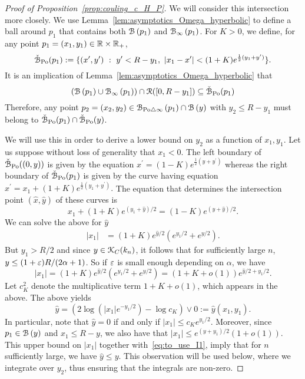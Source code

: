 \begin{proof}[Proof of Proposition~\ref{prop:couling_c_H_P}]
We will consider this intersection more closely. We use Lemma~\ref{lem:asymptotics_Omega_hyperbolic} to define a ball around $p_1$ that contains both 
${\mathcal B}\left(p_1\right)$ and ${\mathcal B}_{\infty}\left(p_1\right)$.
For $K > 0$, we define, for any point $p_1=(x_1,y_1) \in {\ensuremath{\mathbb R}} \times {\ensuremath{\mathbb R}}_+$,
\begin{equation}\label{eq:def_fatball}
	\check{{\mathcal B}}_{{\mathrm{Po}}}(p_1) : = \{ (x',y') \ : \  y' < R - y_1, \ | x_1 - x'| < (1+K) e^{\frac{1}{2} (y_1 + y')}  \}.
\end{equation}
It is an implication of Lemma~\ref{lem:asymptotics_Omega_hyperbolic}  that 
\begin{equation*} %
(\BallHyp{p_1} \cup \BallPo{p_1}) \cap \Rcal([0, R - y_1]) \subseteq \FatBallHyp{p_1}
\end{equation*}
Therefore, any point $p_2 = (x_2,y_2) \in {\mathcal B}_{{\mathrm{Po}} \bigtriangleup \infty}\left(p_1\right) \cap {\mathcal B}\left(y\right)$ with 
$y_2 \leq R-y_1$ must belong to $\check{{\mathcal B}}_{{\mathrm{Po}}}(p_1) \cap \check{{\mathcal B}}_{{\mathrm{Po}}}(y)$.

We will use this in order to derive a lower bound on $y_2$ as a function of $x_1, y_1$. 
Let us suppose without loss of generality that $x_1 < 0$. 
The left boundary of $\check{{\mathcal B}}_{{\mathrm{Po}}}((0,y))$ is given by the equation 
$x^\prime = (1-K)e^{\frac{1}{2} (y + y^\prime)}$ whereas the right boundary of $\check{{\mathcal B}}_{{\mathrm{Po}}}(p_1)$ is given by the curve having equation $x^\prime = x_1 + (1+ K)e^{\frac{1}{2} (y_1 + y^\prime)}.$
The equation that determines the intersection point $(\hat{x},\hat{y})$ of these curves  is
\[
	x_1 + (1+K)e^{(y_1 + \hat{y})/2}= (1-K) e^{(y + \hat{y})/2}.
\]
We can solve the above for $\hat{y}$  
\begin{equation*} 
\begin{split}
|x_1| &=(1+K) e^{\hat{y}/2} \left( e^{y_1/2} + e^{y/2} \right).
\end{split}
\end{equation*}
But $y_1 > R/2$ and since $y \in {\mathcal K}_{C}(k_n)$, it follows that for sufficiently large $n$, $y \le (1+\varepsilon) R /(2\alpha +1)$. So if $\varepsilon$ is small enough depending on $\alpha$, we have 
$$ |x_1| =(1+K) e^{\hat{y}/2} \left( e^{y_1/2} + e^{y/2} \right) = (1+K+o(1))e^{\hat{y}/2 + y_1/2}. $$
Let $c_K^2$ denote the multiplicative term $1+ K+o(1)$, which appears in the above.
The above yields
\begin{equation} \label{eq:to_use_I1}
\hat{y}= \left(2 \log(|x_1|e^{-y_1/2}) - \log c_K \right) \vee 0 := \hat{y}(x_1,y_1). 
\end{equation}
In particular, note that $\hat{y} = 0$ if and only if $|x_1| \leq c_K e^{y_1/2}$.  
Moreover, since $p_1 \in {\mathcal B}\left(y\right)$ and $x_1 \leq R - y$, we also have that 
$|x_1| \leq e^{(y+y_1)/2} (1+o(1))$. This upper bound on $|x_1|$ together with~\eqref{eq:to_use_I1}, imply that for $n$ sufficiently large, we have $\hat{y} \leq y$. This observation will be used below, where 
we integrate over $y_2$, thus ensuring that the integrals are non-zero. 


\end{proof}
